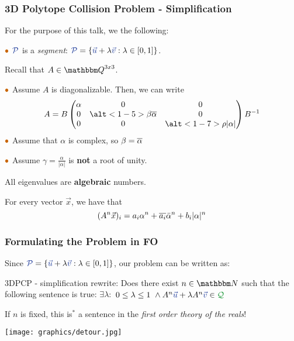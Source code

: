 \begin{frame}
 \frametitle{3D Polytope Collision Problem - Simplification}
For the purpose of this talk, we  the following:

$\emc{orange}{\bullet}$ $\colInit{\P}$ is a \emph{segment}: $\colInit{{\cal P}}= \set{\colInit{\vec{u}}+\lambda \colInit{\vec{v}}: \lambda\in [0,1]}$.

Recall that $A\in \QQ^{3x3}$.

$\emc{orange}{\bullet}$ Assume $A$ is diagonalizable. Then, we can write
$$A=B\begin{pmatrix}
\alpha & 0 & 0\\
0 & \alt<1-5>{\beta}{\conj{\alpha}} & 0\\
0 &0 & \alt<1-7>{\rho}{|\alpha|}\\
\end{pmatrix}B^{-1}$$
$\emc{orange}{\bullet}$ Assume that $\alpha$ is complex, so $\beta={\overline{\alpha}}$ 


$\emc{orange}{\bullet}$ Assume $\gamma=\frac{\alpha}{|\alpha|}$ is \textbf{not} a root of unity.


All eigenvalues are {\bf algebraic} numbers.

For every vector $\vec{x}$, we have that 
$$(A^n\vec{x})_i=a_i \alpha^n+{\overline{a_i}} \bar{\alpha}^n+b_i |\alpha|^n$$
\end{frame}
 
 \newcommand{\foR}{{\text{FO}[\RR]}}
 
\begin{frame}
  \frametitle{Formulating the Problem in FO}
 	
 	Since $\colInit{{\cal P}}= \set{\colInit{\vec{u}}+\lambda \colInit{\vec{v}}: \lambda\in [0,1]}$, our problem can be written as:
 	\onslide<2->
 	\begin{beamerboxesrounded}[upper=uppercolblue,lower=lowercolblue,shadow=true]{3DPCP - simplification rewrite:}
 			Does there exist $n\in \NN$ such that the following sentence is true:
 			$\exists \lambda : $ $0\le \lambda\le 1\ \wedge A^n \colInit{\vec{u}}+\lambda A^n\colInit{\vec{v}}\in \colTarget{{\cal Q}}$
 		\end{beamerboxesrounded}
	If $n$ is fixed, this is$^{*}$ a sentence in the \emph{first order theory of the reals}!
	\onslide<4->
	\begin{center}
	 	\texttt{[image: graphics/detour.jpg]}
	\end{center}

  \end{frame}
  
